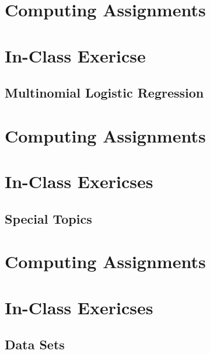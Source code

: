 \documentclass[]{book}
\begin{document}
\part*{Computing
Assignments}\label{part-computing-assignments-4}

\part*{In-Class Exericse}\label{part-in-class-exericse}

\chapter{Multinomial Logistic Regression}\label{multinom-logistic}

\part*{Computing
Assignments}\label{part-computing-assignments-5}

\part*{In-Class Exericses}\label{part-in-class-exericses-2}

\chapter{Special Topics}\label{special}

\part*{Computing
Assignments}\label{part-computing-assignments-6}

\part*{In-Class Exericses}\label{part}

\chapter{Data Sets}\label{data}
\end{document}
